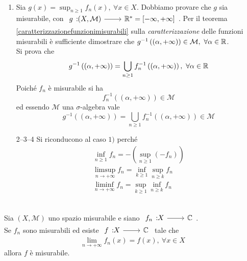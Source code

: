 \begin{demonstration}~{}
	\begin{enumerate}
		\item Sia $g\left(x\right)=\sup_{n\geq 1} f_n\left(x\right),\ \forall x\in X$. Dobbiamo provare che $g$ sia misurabile, con $\funz{g}{\left(X,\mathcal{M}\right)}{\realset^{\ast}=\left[-\infty,+\infty\right]}$. Per il teorema \ref{caratterizzazionefunzionimisurabili} sulla \textit{caratterizzazione} delle funzioni misurabili è sufficiente dimostrare che $g^{-1}\left(\left(\alpha,+\infty\right)\right)\in\mathcal{M},\ \forall\alpha\in\realset$.\\
		Si prova che
		\begin{equation*}
			g^{-1}\left(\left(\alpha,+\infty\right)\right)=\bigcup_{n\geq 1}f_n^{-1}\left(\left(\alpha,+\infty\right)\right),\ \forall \alpha\in\mathbb{R}
		\end{equation*}
	Poiché $f_n$ è misurabile si ha
	\begin{equation*}
		f_n^{-1}\left(\left(\alpha,+\infty\right)\right)\in\mathcal{M}
	\end{equation*}
ed essendo $\mathcal{M}$ una $\sigma$-algebra vale
	\begin{equation*}
	g^{-1}\left(\left(\alpha,+\infty\right)\right)=\bigcup_{n\geq 1}f_n^{-1}\left(\left(\alpha,+\infty\right)\right)\in\mathcal{M}
	\end{equation*}
	\item[2--3--4] Si riconducono al caso $1)$ perché
	\begin{gather*}
		\inf_{n\geq 1}f_n=-\left(\sup_{n\geq 1}\left(-f_n\right)\right)\\
		\limsup_{n\to+\infty}f_n=\inf_{k\geq 1}\sup_{n\geq k}f_n\\
		\liminf_{n\to+\infty}f_n=\sup_{k\geq 1}\inf_{n\geq k}f_n
	\end{gather*}
	\end{enumerate}
\end{demonstration}
\begin{corollary}~{}\\
	Sia $\left(X,\mathcal{M}\right)$ uno spazio misurabile e siano $\funz{f_n}{X}{\complexset}$.\\
	Se $f_n$ sono misurabili ed esiste $\funz{f}{X}{\complexset}$ tale che
	\begin{equation*}
		\lim_{n\to+\infty}f_n\left(x\right)=f\left(x\right),\ \forall x\in X
	\end{equation*}
	allora $f$ è misurabile.
\end{corollary}

